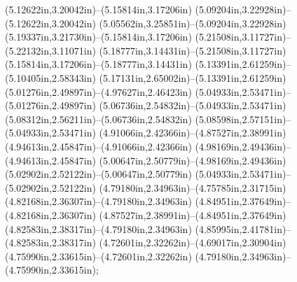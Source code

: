 (5.12622in,3.20042in)--(5.15814in,3.17206in) (5.09204in,3.22928in)--(5.12622in,3.20042in) (5.05562in,3.25851in)--(5.09204in,3.22928in) (5.19337in,3.21730in)--(5.15814in,3.17206in) (5.21508in,3.11727in)--(5.22132in,3.11071in) (5.18777in,3.14431in)--(5.21508in,3.11727in) (5.15814in,3.17206in)--(5.18777in,3.14431in) (5.13391in,2.61259in)--(5.10405in,2.58343in) (5.17131in,2.65002in)--(5.13391in,2.61259in) (5.01276in,2.49897in)--(4.97627in,2.46423in) (5.04933in,2.53471in)--(5.01276in,2.49897in) (5.06736in,2.54832in)--(5.04933in,2.53471in) (5.08312in,2.56211in)--(5.06736in,2.54832in) (5.08598in,2.57151in)--(5.04933in,2.53471in) (4.91066in,2.42366in)--(4.87527in,2.38991in) (4.94613in,2.45847in)--(4.91066in,2.42366in) (4.98169in,2.49436in)--(4.94613in,2.45847in) (5.00647in,2.50779in)--(4.98169in,2.49436in) (5.02902in,2.52122in)--(5.00647in,2.50779in) (5.04933in,2.53471in)--(5.02902in,2.52122in) (4.79180in,2.34963in)--(4.75785in,2.31715in) (4.82168in,2.36307in)--(4.79180in,2.34963in) (4.84951in,2.37649in)--(4.82168in,2.36307in) (4.87527in,2.38991in)--(4.84951in,2.37649in) (4.82583in,2.38317in)--(4.79180in,2.34963in) (4.85995in,2.41781in)--(4.82583in,2.38317in) (4.72601in,2.32262in)--(4.69017in,2.30904in) (4.75990in,2.33615in)--(4.72601in,2.32262in) (4.79180in,2.34963in)--(4.75990in,2.33615in);
